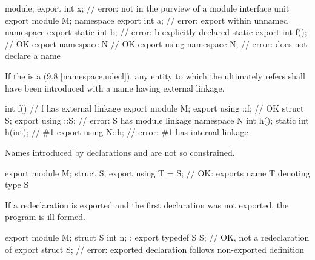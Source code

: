 \begin{std.txt}
  \alinea
  \begin{example}
  \begin{after}\color{addclr}
    \begin{codeblock}
      module;
      export int x;             // error: not in the purview of a module interface unit
      export module M;
      namespace {
        export int a;           // error: export within unnamed namespace
      }
      export static int b;      // error: b explicitly declared static
      export int f();           // OK
      export namespace N { }    // OK
      export using namespace N; // error: does not declare a name
    \end{codeblock}
  \end{after}
  \end{example}

  \alinea
  If the  is a 
  (9.8 [namespace.udecl]), any entity to which the
   ultimately refers shall have been introduced
  with a name having external linkage.
  \begin{example}
    \begin{codeblock}
      int f()               // f has external linkage
      export module M;
      export using ::f;     // OK
      struct S;
      export using ::S;     // error: S has module linkage
      namespace N {
        int h();
        static int h(int);  // \#1
      }
      export using N::h;    // error: \#1 has internal linkage
    \end{codeblock}
  \end{example}
  \enternote
  Names introduced by  declarations
  and 
  are not so constrained.
  \begin{example}
    \begin{codeblock}
      export module M;
      struct S;
      export using T = S;   // OK: exports name T denoting type S
    \end{codeblock}
  \end{example}
  \exitnote

  \begin{after}\color{addclr}
  \alinea
  If a redeclaration is exported
  and the first declaration was not exported,
  the program is ill-formed.
  \begin{example}
  \begin{codeblock}
  export module M;
  struct S { int n; };
  export typedef S S;   // OK, not a redeclaration of 
  export struct S;      // error: exported declaration follows non-exported definition
  \end{codeblock}
  \end{example}
  \end{after}


\end{std.txt}
